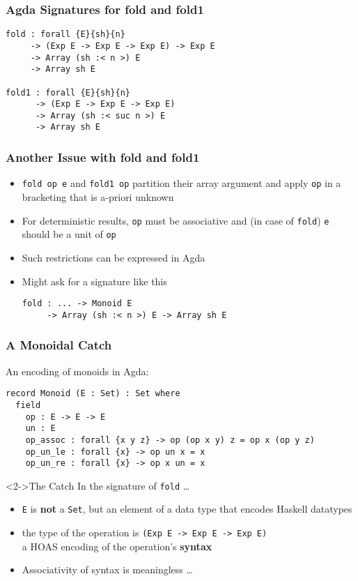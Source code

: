 \documentclass{beamer}
\begin{document}
\begin{frame}[fragile]
  \frametitle{Agda Signatures for fold and fold1}
\begin{verbatim}
fold : forall {E}{sh}{n}
     -> (Exp E -> Exp E -> Exp E) -> Exp E
     -> Array (sh :< n >) E 
     -> Array sh E

fold1 : forall {E}{sh}{n}
      -> (Exp E -> Exp E -> Exp E)
      -> Array (sh :< suc n >) E
      -> Array sh E
\end{verbatim}
\end{frame}
\begin{frame}[fragile]
  \frametitle{Another Issue with fold and fold1}
  \begin{itemize}
  \item \texttt{fold op e} and \texttt{fold1 op}  partition their array
    argument and apply \texttt{op} in a bracketing that is a-priori unknown
  \item For deterministic results, \texttt{op} must be associative and
    (in case of \texttt{fold}) \texttt{e} should be a unit of \texttt{op}
  \item<2-> Such restrictions can be expressed in Agda
  \item<3-> Might ask for a signature like this
\begin{verbatim}
fold : ... -> Monoid E
     -> Array (sh :< n >) E -> Array sh E
\end{verbatim}
  \end{itemize}
\end{frame}
\begin{frame}[fragile]
  \frametitle{A Monoidal Catch}
An encoding of monoids in Agda:\scriptsize
\begin{verbatim}
record Monoid (E : Set) : Set where
  field
    op : E -> E -> E
    un : E
    op_assoc : forall {x y z} -> op (op x y) z = op x (op y z)
    op_un_le : forall {x} -> op un x = x
    op_un_re : forall {x} -> op x un = x
\end{verbatim}
\normalsize
\begin{block}<2->{The Catch}
  In the signature of \texttt{fold} \dots
  \begin{itemize}
  \item \texttt{E} is \textbf{not} a \texttt{Set}, but an element of a
    data type that encodes Haskell datatypes
  \item the type of the operation is
    \texttt{(Exp E -> Exp E -> Exp E)}\\
    a HOAS encoding of the operation's \textbf{syntax}
  \item<3-> Associativity of syntax is meaningless \dots 
  \end{itemize}
\end{block}
\end{frame}
\end{document}

